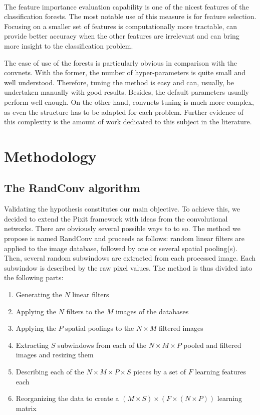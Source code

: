 \documentclass[a4paper]{report}
\begin{document}
\paragraph{}
The feature importance evaluation capability is one of the nicest features of the classification forests. The most notable use of this measure is for feature selection. Focusing on a smaller set of features is computationally more tractable, can provide better accuracy when the other features are irrelevant and can bring more insight to the classification problem.
\par
The ease of use of the forests is particularly obvious in comparison with the convnets. With the former, the number of hyper-parameters is quite small and well understood. Therefore, tuning the method is easy and can, usually, be undertaken manually with good results. Besides, the default parameters usually perform well enough. On the other hand, convnets tuning is much more complex, as even the structure has to be adapted for each problem. Further evidence of this complexity is the amount of work dedicated to this subject in the literature. %



\section{Methodology}
\subsection{The RandConv algorithm}
Validating the hypothesis constitutes our main objective.  
To achieve this, we decided to extend the Pixit framework with ideas from the convolutional networks. There are obviously several possible ways to to so. The method we propose is named RandConv and proceeds as follows: random linear filters are applied to the image database, followed by one or several spatial pooling(s). Then, several random subwindows are extracted from each processed image. Each subwindow is described by the raw pixel values. The method is thus divided into the following parts:
	
	\begin{enumerate}
		\item Generating the $N$ linear filters
		\item Applying the $N$ filters to the $M$ images of the databases
		\item Applying the $P$ spatial poolings to the $N \times M$ filtered images
		\item Extracting $S$ subwindows from each of the $N \times M \times P$ pooled and filtered images and resizing them
		\item Describing each of the $N \times M \times P \times S$ pieces by a set of $F$ learning features each
		\item Reorganizing the data to create a $(M \times S) \times (F \times (N \times P))$ learning matrix
	\end{enumerate}
	
\end{document}
